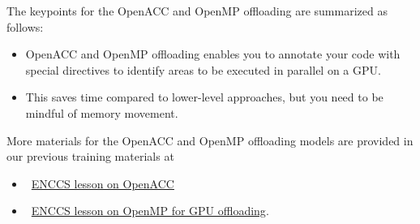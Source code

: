 \par
The keypoints for the OpenACC and OpenMP offloading are summarized as follows:
\begin{itemize}
    \item OpenACC and OpenMP offloading enables you to annotate your code with special directives to identify areas to be executed in parallel on a GPU.
    \item This saves time compared to lower-level approaches, but you need to be mindful of memory movement.
\end{itemize}


\par
More materials for the OpenACC and OpenMP offloading models are provided in our previous training materials at
\begin{itemize}
    \item~\href{https://enccs.github.io/openacc/}{ENCCS lesson on OpenACC}
    \item~\href{https://enccs.github.io/openmp-gpu/}{ENCCS lesson on OpenMP for GPU offloading}.
\end{itemize}

